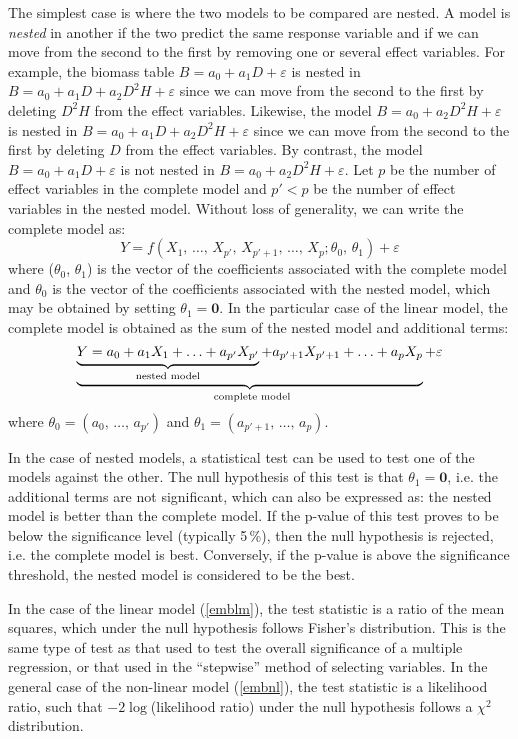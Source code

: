 The simplest case is where the two models to be compared are nested. A model is \emph{nested} in another if the two predict the same response variable and if we can move from the second to the first by removing one or several effect variables. For example, the biomass table $B=a_0+a_1D+\varepsilon$ is nested in $B=a_0+a_1D+a_2D^2H+\varepsilon$ since we can move from the second to the first by deleting $D^2H$ from the effect variables. Likewise, the model $B=a_0+a_2D^2H+\varepsilon$ is nested in $B=a_0+a_1D+a_2D^2H+\varepsilon$ since we can move from the second to the first by deleting $D$ from the effect variables. By contrast, the model $B=a_0+a_1D+\varepsilon$ is not nested in $B=a_0+a_2D^2H+\varepsilon$.
Let $p$ be the number of effect variables in the complete model and $p'<p$ be the number of effect variables in the nested model. Without loss of generality, we can write the complete model as:
\begin{equation}
Y=f(X_1,\,\ldots,\,X_{p'},\,X_{p'+1},\,\ldots,\,X_p;
\theta_0,\,\theta_1)+\varepsilon\label{embnl}
\end{equation}
where ($\theta_0$, $\theta_1$) is the vector of the coefficients associated with the complete model and $\theta_0$ is the vector of the coefficients associated with the nested model, which may be obtained by setting 
$\theta_1=\mathbf{0}$. In the particular case of the linear model, the complete model is obtained as the sum of the nested model and additional terms:
\begin{equation}
\underbrace{\underbrace{Y=a_0+a_1X_1+\ldots+a_{p'}X_{p'}}_{\mbox{\scriptsize
nested model}}+a_{p'+1}X_{p'+1}+\ldots+a_pX_p}_{\mbox{
\scriptsize complete model}}+\varepsilon\label{emblm}
\end{equation}
where $\theta_0=(a_0,\,\ldots,\,a_{p'})$ and
$\theta_1=(a_{p'+1},\,\ldots,\,a_p)$.

In the case of nested models, a statistical test can be used to test one of the models against the other. The null hypothesis of this test is that $\theta_1=\mathbf{0}$, i.e. the additional terms are not significant, which can also be expressed as: the nested model is better than the complete model. If the p-value of this test proves to be below the significance level (typically 5\,\%), then the null hypothesis is rejected, i.e. the complete model is best. Conversely, if the p-value is above the significance threshold, the nested model is considered to be the best.

In the case of the linear model (\ref{emblm}), the test statistic is a ratio of the mean squares, which under the null hypothesis follows Fisher's distribution. This is the same type of test as that used to test the overall significance of a multiple regression, or that used in the ``stepwise'' method of selecting variables. In the general case of the non-linear model (\ref{embnl}), the test statistic is a likelihood ratio, such that $-2\log$(likelihood ratio) under the null hypothesis follows a $\chi^2$ distribution.

